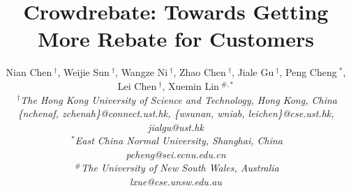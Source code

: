 \documentclass[conference]{IEEEtran}
\title{Crowdrebate: Towards Getting More Rebate for Customers}
\author{
	{Nian Chen{\small $~^{\dagger}$}, Weijie Sun{\small $~^{\dagger}$}, Wangze Ni{\small $~^{\dagger}$}, Zhao Chen{\small $~^{\dagger}$}, Jiale Gu{\small $~^{\dagger}$}, Peng Cheng{\small $~^{*}$}, Lei Chen{\small $~^{\dagger}$}, Xuemin Lin{\small $~^{\#,*}$}
	} \\
	\fontsize{10}{10}\selectfont\itshape
	$~^{\dagger}$The Hong Kong University of Science and Technology, Hong Kong, China\\
	\fontsize{9}{9}\selectfont\ttfamily\upshape
	\{nchenaf, zchenah\}@connect.ust.hk, \{wsunan, wniab, leichen\}@cse.ust.hk, jialgu@ust.hk\\
	\fontsize{10}{10}\selectfont\itshape
	$~^{*}$East China Normal University, Shanghai, China\\
	\fontsize{9}{9}\selectfont\ttfamily\upshape pcheng@sei.ecnu.edu.cn \\
	\fontsize{10}{10}\selectfont\itshape
	$~^{\#}$The University of New South Wales, Australia\\
	\fontsize{9}{9}\selectfont\ttfamily\upshape
	lxue@cse.unsw.edu.au\\
}
\begin{document}
\maketitle





%



\balance




\bgroup\small

\let\xxx=\bibitem\def\bibitem{\par\vspace{0mm}\xxx} %

\egroup

\nobalance
\newpage
\end{document}
